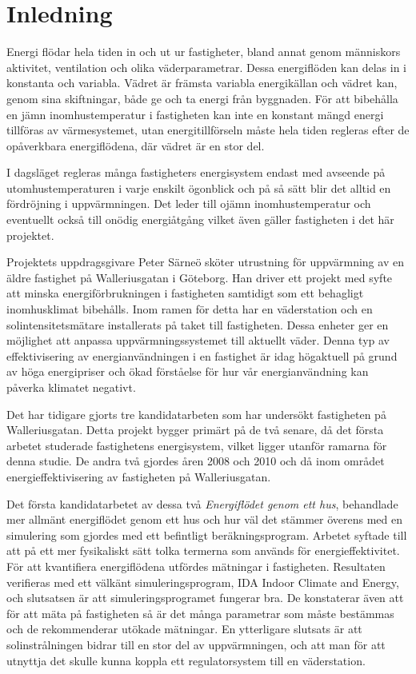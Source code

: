 \chapter{Inledning}

Energi flödar hela tiden in och ut ur fastigheter, bland annat genom människors aktivitet, ventilation och olika väderparametrar. Dessa energiflöden kan delas in i konstanta och variabla. Vädret är främsta variabla energikällan och vädret kan, genom sina skiftningar, både ge och ta energi från byggnaden. För att bibehålla en jämn inomhustemperatur i fastigheten kan inte en konstant mängd energi tillföras av värmesystemet, utan energitillförseln måste hela tiden regleras efter de opåverkbara energiflödena, där vädret är en stor del.

I dagsläget regleras många fastigheters energisystem endast med avseende på utomhustemperaturen i varje enskilt ögonblick och på så sätt blir det alltid en fördröjning i uppvärmningen. Det leder till ojämn inomhustemperatur och eventuellt också till onödig energiåtgång vilket även gäller fastigheten i det här projektet.

Projektets uppdragsgivare Peter Särneö sköter utrustning för uppvärmning av en äldre fastighet på Walleriusgatan i Göteborg. Han driver ett projekt med syfte att minska energiförbrukningen i fastigheten samtidigt som ett behagligt inomhusklimat bibehålls. Inom ramen för detta har en väderstation och en solintensitetsmätare installerats på taket till fastigheten. Dessa enheter ger en möjlighet att anpassa uppvärmningssystemet till aktuellt  väder. Denna typ av effektivisering av energianvändningen i en fastighet är idag högaktuell på grund av höga energipriser och ökad förståelse för hur vår energianvändning kan påverka klimatet negativt.

Det har tidigare gjorts tre kandidatarbeten som har undersökt fastigheten på Walleriusgatan. Detta projekt bygger primärt på de två senare, då det första arbetet studerade fastighetens energisystem, vilket ligger utanför ramarna för denna studie. De andra två gjordes åren 2008 och 2010 och då inom området energieffektivisering av fastigheten på Walleriusgatan. 

Det första kandidatarbetet av dessa två \textit{Energiflödet genom ett hus}\cite{kandidatarbete2008},
behandlade mer allmänt energiflödet genom ett hus och hur väl det stämmer
överens med en simulering som gjordes med ett befintligt beräkningsprogram. Arbetet syftade
till att på ett mer fysikaliskt sätt tolka termerna som används för
energieffektivitet. För att kvantifiera energiflödena utfördes mätningar i
fastigheten. Resultaten verifieras med ett välkänt simuleringsprogram,
IDA Indoor Climate and Energy, och slutsatsen är att simuleringsprogramet fungerar bra.
De konstaterar även att för att mäta på fastigheten så är det många parametrar som
måste bestämmas och de rekommenderar utökade mätningar.
 En ytterligare slutsats är att solinstrålningen bidrar till en stor del av
uppvärmningen, och att man för att utnyttja det skulle kunna koppla ett
regulatorsystem till en väderstation.

